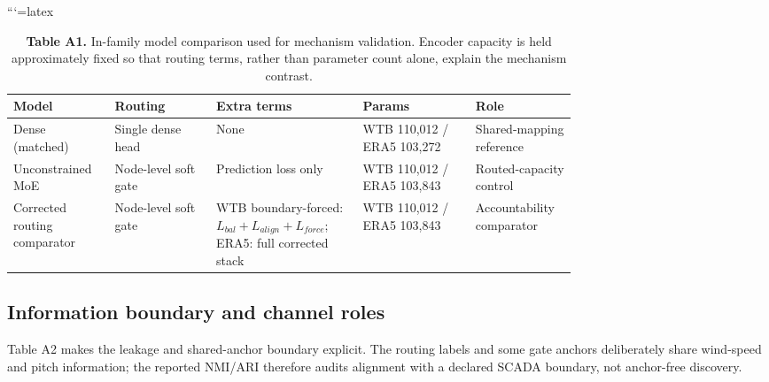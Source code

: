 \documentclass[
  journal]{IEEEtran}
\begin{document}
```{=latex}
\begin{table}[!t]
\centering
\fontsize{8.0pt}{9.6pt}\selectfont
\setlength{\tabcolsep}{3pt}
\renewcommand{\arraystretch}{1.05}
\caption*{\textbf{Table A1.} In-family model comparison used for mechanism validation. Encoder capacity is held approximately fixed so that routing terms, rather than parameter count alone, explain the mechanism contrast.}
\begin{tabularx}{\linewidth}{>{\raggedright\arraybackslash}p{0.18\linewidth} >{\raggedright\arraybackslash}p{0.18\linewidth} >{\raggedright\arraybackslash}X >{\raggedright\arraybackslash}p{0.20\linewidth} >{\raggedright\arraybackslash}p{0.18\linewidth}}
\toprule
Model & Routing & Extra terms & Params & Role \\
\midrule
Dense (matched) & Single dense head & None & WTB 110,012 / ERA5 103,272 & Shared-mapping reference \\
Unconstrained MoE & Node-level soft gate & Prediction loss only & WTB 110,012 / ERA5 103,843 & Routed-capacity control \\
Corrected routing comparator & Node-level soft gate & WTB boundary-forced: $L_{bal}+L_{align}+L_{force}$; ERA5: full corrected stack & WTB 110,012 / ERA5 103,843 & Accountability comparator \\
\bottomrule
\end{tabularx}
\end{table}

\FloatBarrier

\subsection*{Information boundary and channel
roles}\label{information-boundary-and-channel-roles}

Table A2 makes the leakage and shared-anchor boundary explicit. The
routing labels and some gate anchors deliberately share wind-speed and
pitch information; the reported NMI/ARI therefore audits alignment with
a declared SCADA boundary, not anchor-free discovery.
\end{document}
